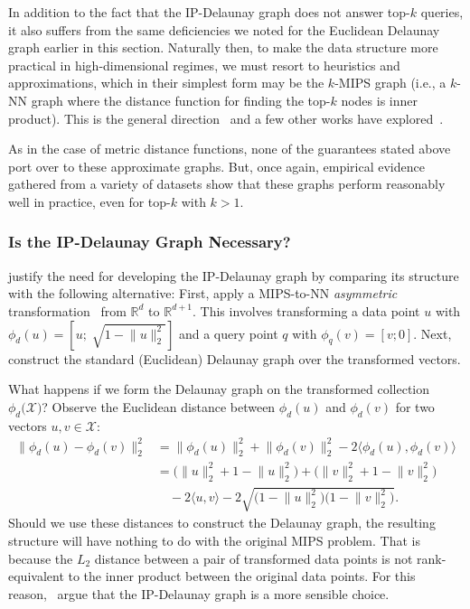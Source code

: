 \medskip

In addition to the fact that the IP-Delaunay graph does not answer top-$k$ queries,
it also suffers from the same deficiencies we noted for the Euclidean Delaunay graph earlier
in this section. Naturally then, to make the data structure more practical in high-dimensional
regimes, we must resort to heuristics and approximations, which in their simplest form may be
the $k$-MIPS graph (i.e., a $k$-NN graph where the distance function for finding the top-$k$
nodes is inner product).
This is the general direction~\cite{morozov2018ip-nsw} and a few other works
have explored~\citep{Liu2019UnderstandingAI,zhou2019mobius-mips}.

As in the case of metric distance functions, none of the guarantees stated above
port over to these approximate graphs. But, once again, empirical evidence gathered from
a variety of datasets show that these graphs perform reasonably well in practice, even for top-$k$
with $k > 1$.

\subsubsection{Is the IP-Delaunay Graph Necessary?}
\cite{morozov2018ip-nsw} justify the need for developing the IP-Delaunay graph
by comparing its structure with the following alternative:
First, apply a MIPS-to-NN \emph{asymmetric} transformation~\citep{xbox-tree}
from $\mathbb{R}^d$ to $\mathbb{R}^{d + 1}$.
This involves transforming a data point $u$ with
$\phi_d(u) = [u; \; \sqrt{1 - \lVert u \rVert_2^2}]$ and a query point $q$
with $\phi_q(v) = [v; 0]$. Next,
construct the standard (Euclidean) Delaunay graph over the transformed vectors.

What happens if we form the Delaunay graph on the transformed collection
$\phi_d \big(\mathcal{X} \big)$? Observe the Euclidean distance between
$\phi_d(u)$ and $\phi_d(v)$ for two vectors $u, v \in \mathcal{X}$:
\begin{align*}
    \lVert \phi_d(u) - \phi_d(v) \rVert_2^2 &=
        \lVert \phi_d(u) \rVert_2^2 + \lVert \phi_d(v) \rVert_2^2 - 2 \langle \phi_d(u), \phi_d(v) \rangle \\
    &= \big( \lVert u \rVert_2^2 + 1 - \lVert u \rVert_2^2 \big) +
        \big( \lVert v \rVert_2^2 + 1 - \lVert v \rVert_2^2 \big) \\
        &\quad - 2\langle u, v \rangle -
        2 \sqrt{\big( 1 - \lVert u \rVert_2^2 \big) \big( 1 - \lVert v \rVert_2^2 \big)}.
\end{align*}
Should we use these distances to construct the Delaunay graph, the resulting
structure will have nothing to do with the original MIPS problem.
That is because the $L_2$ distance between a pair of transformed data points
is not rank-equivalent to the inner product between the original data points.
For this reason,~\cite{morozov2018ip-nsw} argue that the IP-Delaunay graph is a more
sensible choice.

